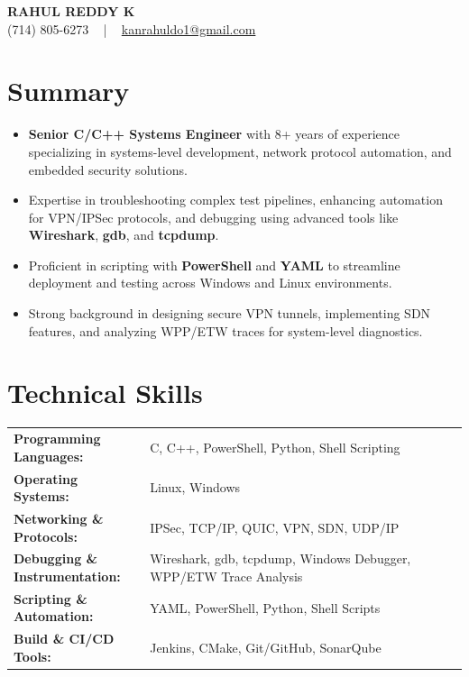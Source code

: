 \documentclass[letterpaper,11pt]{article}
\newcommand{\resumeItem}[1]{
  \item\footnotesize{
    {#1 \vspace{-2pt}}
  }
}
\newcommand{\resumeItemListStart}{\begin{itemize}[leftmargin=*]}
\newcommand{\resumeItemListEnd}{\end{itemize}\vspace{-5pt}}
\begin{document}
\begin{center}
    {\fontsize{14pt}{12pt}\selectfont \textbf{\MakeUppercase{Rahul Reddy K}}}\\ \vspace{2pt}
    \fontsize{10pt}{12pt}\selectfont (714) 805-6273 ~ | ~ \href{mailto:kanrahuldo1@gmail.com}{kanrahuldo1@gmail.com}~
    \vspace{-8pt}
\end{center}

\section{Summary}
\fontsize{9pt}{10pt}\selectfont
\resumeItemListStart
    \resumeItem{\textbf{Senior C/C++ Systems Engineer} with 8+ years of experience specializing in systems-level development, network protocol automation, and embedded security solutions.}
    \resumeItem{Expertise in troubleshooting complex test pipelines, enhancing automation for VPN/IPSec protocols, and debugging using advanced tools like \textbf{Wireshark}, \textbf{gdb}, and \textbf{tcpdump}.}
    \resumeItem{Proficient in scripting with \textbf{PowerShell} and \textbf{YAML} to streamline deployment and testing across Windows and Linux environments.}
    \resumeItem{Strong background in designing secure VPN tunnels, implementing SDN features, and analyzing WPP/ETW traces for system-level diagnostics.}
\resumeItemListEnd
\vspace{-6pt}

\section{Technical Skills}
        \vspace{-14pt}
        \begin{table}[h]
            \fontsize{9pt}{10pt}\selectfont
            \begin{tabular}{p{0.3\linewidth} p{0.7\linewidth}}
                \textbf{Programming Languages:} & C, C++, PowerShell, Python, Shell Scripting \\
                \textbf{Operating Systems:} & Linux, Windows \\
                \textbf{Networking \& Protocols:} & IPSec, TCP/IP, QUIC, VPN, SDN, UDP/IP \\
                \textbf{Debugging \& Instrumentation:} & Wireshark, gdb, tcpdump, Windows Debugger, WPP/ETW Trace Analysis \\
                \textbf{Scripting \& Automation:} & YAML, PowerShell, Python, Shell Scripts \\
                \textbf{Build \& CI/CD Tools:} & Jenkins, CMake, Git/GitHub, SonarQube \\
            \end{tabular}
        \end{table}
    \vspace{-15pt}
\end{document}
